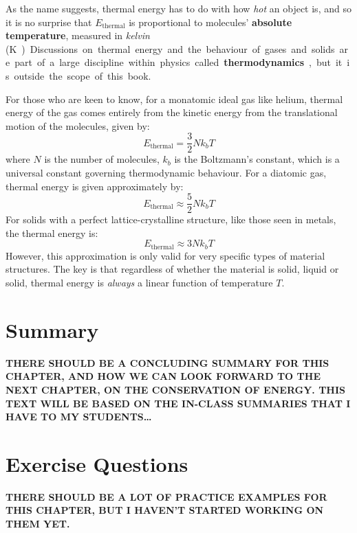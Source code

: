 As the name suggests, thermal energy has to do with how \emph{hot} an object
is, and so it is no surprise that $E_\text{thermal}$ is proportional to
molecules' \textbf{absolute temperature}, measured in \emph{kelvin}
(\si\kelvin). Discussions on thermal energy and the behaviour of gases and
solids are part of a large discipline within physics called
\textbf{thermodynamics}, but it is outside the scope of this book.
\begin{remark}
  For those who are keen to know, for a monatomic ideal gas like helium,
  thermal energy of the gas comes entirely from the kinetic energy from the
  translational motion of the molecules, given by:
  \begin{equation*}
    E_\text{thermal}=\dfrac32Nk_bT
  \end{equation*}
  where $N$ is the number of molecules, $k_b$ is the Boltzmann's constant,
  which is a universal constant governing thermodynamic behaviour. For a
  diatomic gas, thermal energy is given approximately by:
  \begin{equation*}
    E_\text{thermal}\approx\dfrac52Nk_bT
  \end{equation*}
  For solids with a perfect lattice-crystalline structure, like those seen in
  metals, %
  the thermal energy is:
  \begin{equation*}
    E_\text{thermal}\approx3Nk_bT
  \end{equation*}
  However, this approximation is only valid for very specific types of material
  structures. The key is that regardless of whether the material is solid,
  liquid or solid, thermal energy is \emph{always} a linear function of
  temperature $T$.
\end{remark}


\section{Summary}
\textbf{THERE SHOULD BE A CONCLUDING SUMMARY FOR THIS CHAPTER, AND HOW WE
  CAN LOOK FORWARD TO THE NEXT CHAPTER, ON THE CONSERVATION OF ENERGY. THIS
  TEXT WILL BE BASED ON THE IN-CLASS SUMMARIES THAT I HAVE TO MY STUDENTS\ldots
}



\section*{Exercise Questions}
\textbf{THERE SHOULD BE A LOT OF PRACTICE EXAMPLES FOR THIS CHAPTER, BUT I
  HAVEN'T STARTED WORKING ON THEM YET.}




